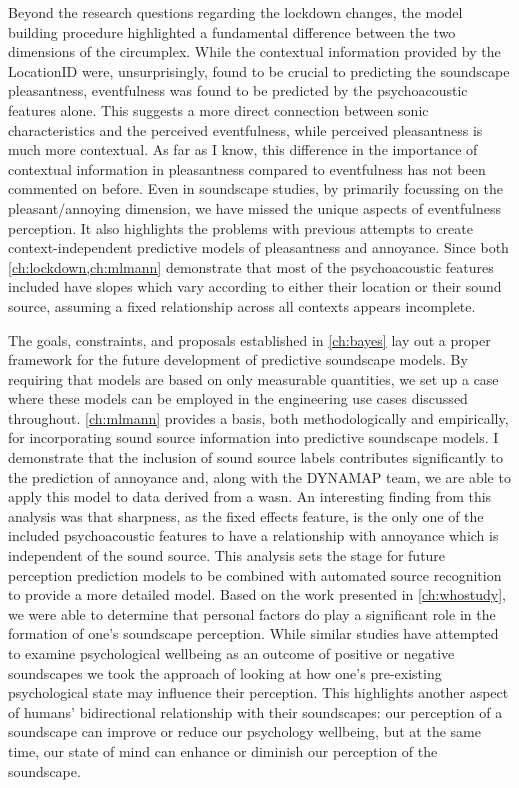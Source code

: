 Beyond the research questions regarding the lockdown changes, the model building procedure highlighted a fundamental difference between the two dimensions of the circumplex. While the contextual information provided by the LocationID were, unsurprisingly, found to be crucial to predicting the soundscape pleasantness, eventfulness was found to be predicted by the psychoacoustic features alone. This suggests a more direct connection between sonic characteristics and the perceived eventfulness, while perceived pleasantness is much more contextual. As far as I know, this difference in the importance of contextual information in pleasantness compared to eventfulness has not been commented on before. Even in soundscape studies, by primarily focussing on the pleasant/annoying dimension, we have missed the unique aspects of eventfulness perception. It also highlights the problems with previous attempts to create context-independent predictive models of pleasantness and annoyance. Since both \cref{ch:lockdown,ch:mlmann} demonstrate that most of the psychoacoustic features included have slopes which vary according to either their location or their sound source, assuming a fixed relationship across all contexts appears incomplete.

The goals, constraints, and proposals established in \cref{ch:bayes} lay out a proper framework for the future development of predictive soundscape models. By requiring that models are based on only measurable quantities, we set up a case where these models can be employed in the engineering use cases discussed throughout. \cref{ch:mlmann} provides a basis, both methodologically and empirically, for incorporating sound source information into predictive soundscape models. I demonstrate that the inclusion of sound source labels contributes significantly to the prediction of annoyance and, along with the DYNAMAP team, we are able to apply this model to data derived from a \gls{wasn}. An interesting finding from this analysis was that sharpness, as the fixed effects feature, is the only one of the included psychoacoustic features to have a relationship with annoyance which is independent of the sound source. This analysis sets the stage for future perception prediction models to be combined with automated source recognition to provide a more detailed model. Based on the work presented in \cref{ch:whostudy}, we were able to determine that personal factors do play a significant role in the formation of one's soundscape perception. While similar studies have attempted to examine psychological wellbeing as an outcome of positive or negative soundscapes \citep{Tarlao2020Investigating,Aletta2018Associations} we took the approach of looking at how one's pre-existing psychological state may influence their perception. This highlights another aspect of humans' bidirectional relationship with their soundscapes: our perception of a soundscape can improve or reduce our psychology wellbeing, but at the same time, our state of mind can enhance or diminish our perception of the soundscape. 

